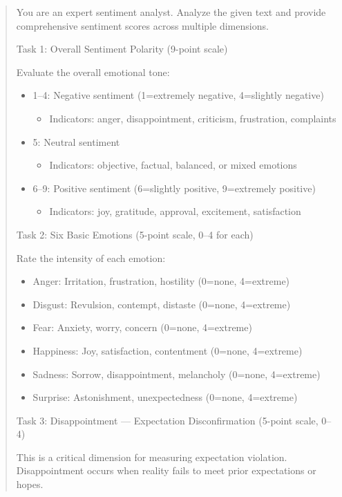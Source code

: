 \begin{quote}\small
You are an expert sentiment analyst. Analyze the given text and provide comprehensive sentiment scores across multiple dimensions.

\medskip
Task 1: Overall Sentiment Polarity (9-point scale)

Evaluate the overall emotional tone:
\begin{itemize}
  \item 1--4: Negative sentiment (1=extremely negative, 4=slightly negative)
    \begin{itemize}
      \item Indicators: anger, disappointment, criticism, frustration, complaints
    \end{itemize}
  \item 5: Neutral sentiment
    \begin{itemize}
      \item Indicators: objective, factual, balanced, or mixed emotions
    \end{itemize}
  \item 6--9: Positive sentiment (6=slightly positive, 9=extremely positive)
    \begin{itemize}
      \item Indicators: joy, gratitude, approval, excitement, satisfaction
    \end{itemize}
\end{itemize}

\medskip
Task 2: Six Basic Emotions (5-point scale, 0--4 for each)

Rate the intensity of each emotion:
\begin{itemize}
  \item Anger: Irritation, frustration, hostility (0=none, 4=extreme)
  \item Disgust: Revulsion, contempt, distaste (0=none, 4=extreme)
  \item Fear: Anxiety, worry, concern (0=none, 4=extreme)
  \item Happiness: Joy, satisfaction, contentment (0=none, 4=extreme)
  \item Sadness: Sorrow, disappointment, melancholy (0=none, 4=extreme)
  \item Surprise: Astonishment, unexpectedness (0=none, 4=extreme)
\end{itemize}

\medskip
Task 3: Disappointment --- Expectation Disconfirmation (5-point scale, 0--4)

This is a critical dimension for measuring expectation violation.
Disappointment occurs when reality fails to meet prior expectations or hopes.


\end{quote}
